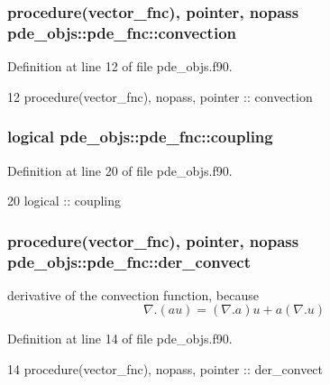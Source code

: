 \subsubsection[{convection}]{\setlength{\rightskip}{0pt plus 5cm}procedure({\bf vector\+\_\+fnc}), pointer, nopass pde\+\_\+objs\+::pde\+\_\+fnc\+::convection}\label{structpde__objs_1_1pde__fnc_a79662b3e1df2a79331c5199f11752227}


Definition at line 12 of file pde\+\_\+objs.\+f90.


\begin{DoxyCode}
12     \textcolor{keywordtype}{procedure}(vector_fnc), \textcolor{keywordtype}{nopass}, \textcolor{keywordtype}{pointer}           :: convection
\end{DoxyCode}
\subsubsection[{coupling}]{\setlength{\rightskip}{0pt plus 5cm}logical pde\+\_\+objs\+::pde\+\_\+fnc\+::coupling}\label{structpde__objs_1_1pde__fnc_af57902308af20272e904b7527d3aac5c}


Definition at line 20 of file pde\+\_\+objs.\+f90.


\begin{DoxyCode}
20     \textcolor{keywordtype}{logical}                                          :: coupling
\end{DoxyCode}
\subsubsection[{der\+\_\+convect}]{\setlength{\rightskip}{0pt plus 5cm}procedure({\bf vector\+\_\+fnc}), pointer, nopass pde\+\_\+objs\+::pde\+\_\+fnc\+::der\+\_\+convect}\label{structpde__objs_1_1pde__fnc_a902e5d5219bfc4a9cc85653121c139eb}


derivative of the convection function, because \[ \nabla .(a u) = (\nabla . a) u + a (\nabla . u) \] 



Definition at line 14 of file pde\+\_\+objs.\+f90.


\begin{DoxyCode}
14     \textcolor{keywordtype}{procedure}(vector_fnc), \textcolor{keywordtype}{nopass}, \textcolor{keywordtype}{pointer}           :: der\_convect
\end{DoxyCode}
